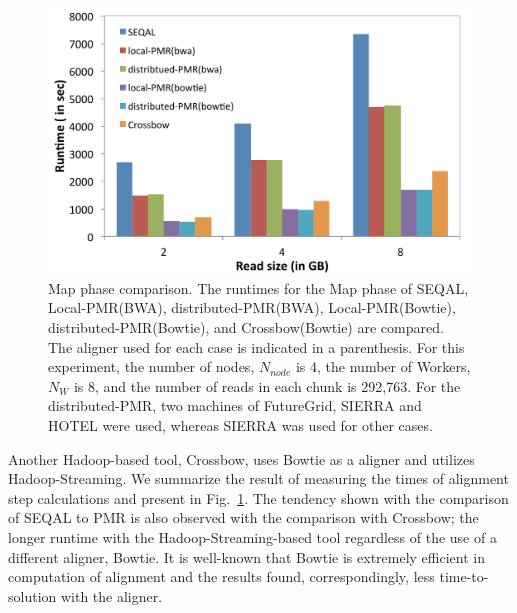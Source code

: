 \documentclass{sig-alternate}
\begin{document}
{\begin{figure} 
 \centering
\includegraphics[scale=0.40]{figures/map_comp.pdf}
\caption{\small  Map phase comparison.  The runtimes for the Map phase of SEQAL, Local-PMR(BWA), distributed-PMR(BWA), Local-PMR(Bowtie), distributed-PMR(Bowtie), and Crossbow(Bowtie) are compared.  The aligner used for each case is indicated in a parenthesis.  For this experiment, the number of nodes, $N_{node}$ is 4, the number of Workers, $N_W$ is 8, and the number of reads in each chunk is 292,763.  For the distributed-PMR, two machines of FutureGrid, SIERRA and HOTEL were used, whereas SIERRA was used for other cases.}
  \label{fig:tool_comp} 
\end{figure}


Another Hadoop-based tool, Crossbow, uses Bowtie as a aligner and utilizes Hadoop-Streaming\cite{hadoop-url}.  We summarize the result of measuring the times of alignment step calculations and present in Fig.~\ref{fig:tool_comp}.   The tendency shown with the comparison of SEQAL to PMR is also observed with the comparison with Crossbow; the longer runtime with the Hadoop-Streaming-based tool regardless of the use of a different aligner, Bowtie.  It is well-known that Bowtie is extremely efficient in computation of alignment and the results found, correspondingly, less time-to-solution with the aligner.  


}
\end{document}
